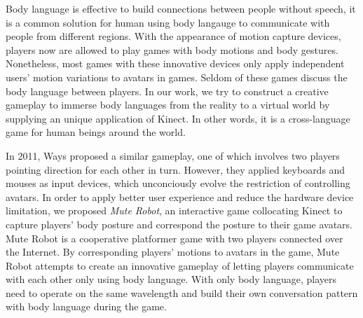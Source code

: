 \documentclass{chi-ext}
\begin{document}
Body language is effective to build connections between people without speech, it is a common solution for human using body langauge to communicate with people from different regions.
With the appearance of motion capture devices, players now are allowed to play games with body motions and body gestures.
Nonetheless, most games with these innovative devices only apply independent users' motion variations to avatars in games. 
Seldom of these games discuss the body language between players.
In our work, we try to construct a creative gameplay to immerse body languages from the reality to a virtual world by supplying an unique application of Kinect.
In other words, it is a cross-language game for human beings around the world.

In 2011, Ways\cite{Ways} proposed a similar gameplay, one of which involves two players pointing direction for each other in turn.
However, they applied keyboards and mouses as input devices, which unconciously evolve the restriction of controlling avatars. 
In order to apply better user experience and reduce the hardware device limitation, we proposed {\it Mute Robot}, an interactive game collocating Kinect to capture players' body posture and correspond the posture to their game avatars. 
Mute Robot is a cooperative platformer game with two players connected over the Internet.
By corresponding players' motions to avatars in the game, Mute Robot attempts to create an innovative gameplay of letting players communicate with each other only using body language.
With only body language, players need to operate on the same wavelength and build their own conversation pattern with body language during the game.
\end{document}
